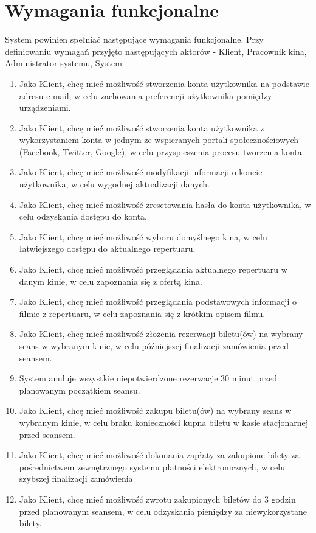 \section{Wymagania funkcjonalne}
System powinien spełniać następujące wymagania funkcjonalne. Przy definiowaniu wymagań przyjęto następujących aktorów - Klient, Pracownik kina, Administrator systemu, System 
\begin{enumerate}
\item Jako Klient, chcę mieć możliwość stworzenia konta użytkownika na podstawie adresu e-mail, w celu zachowania preferencji użytkownika pomiędzy urządzeniami.
\item Jako Klient, chcę mieć możliwość stworzenia konta użytkownika z wykorzystaniem konta w jednym ze wspieranych portali społecznościowych (Facebook, Twitter, Google), w celu przyspieszenia procesu tworzenia konta.
\item Jako Klient, chcę mieć możliwość modyfikacji informacji o koncie użytkownika, w celu wygodnej aktualizacji danych.
\item Jako Klient, chcę mieć możliwość zresetowania hasła do konta użytkownika, w celu odzyskania dostępu do konta. 
\item Jako Klient, chcę mieć możliwość wyboru domyślnego kina, w celu łatwiejszego dostępu do aktualnego repertuaru.
\item Jako Klient, chcę mieć możliwość przeglądania aktualnego repertuaru w danym kinie, w celu zapoznania się z ofertą kina.
\item Jako Klient, chcę mieć możliwość przeglądania podstawowych informacji o filmie z repertuaru, w celu zapoznania się z krótkim opisem filmu. 
\item Jako Klient, chcę mieć możliwość złożenia rezerwacji biletu(ów) na wybrany seans w wybranym kinie, w celu późniejszej finalizacji zamówienia przed seansem.
\item System anuluje wszystkie niepotwierdzone rezerwacje 30 minut przed planowanym początkiem seansu. 
\item Jako Klient, chcę mieć możliwość zakupu biletu(ów) na wybrany seans w wybranym kinie, w celu braku konieczności kupna biletu w kasie stacjonarnej przed seansem.
\item Jako Klient, chcę mieć możliwość dokonania zapłaty za zakupione bilety za pośrednictwem zewnętrznego systemu płatności elektronicznych, w celu szybszej finalizacji zamówienia
\item Jako Klient, chcę mieć możliwość zwrotu zakupionych biletów do 3 godzin przed planowanym seansem, w celu odzyskania pieniędzy za niewykorzystane bilety.

\end{enumerate}
